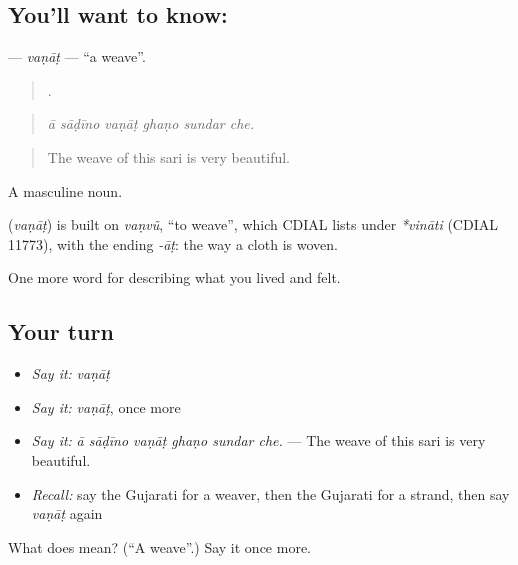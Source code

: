 \subsection*{You'll want to know: }
\textbf{} — \emph{vaṇāṭ} — \textquotedblleft{}a weave\textquotedblright{}.

\begin{quote}
     .
\end{quote}

\begin{quote}
\emph{ā sāḍīno vaṇāṭ ghaṇo sundar che.}
\end{quote}

\begin{quote}
The weave of this sari is very beautiful.
\end{quote}

A masculine noun.

\begin{cousinweb}
\textbf{} (\emph{vaṇāṭ}) is built on \emph{vaṇvũ}, \textquotedblleft{}to weave\textquotedblright{}, which CDIAL lists under \emph{*vināti} (CDIAL 11773), with the ending \emph{-āṭ}: the way a cloth is woven.
\end{cousinweb}

\begin{grammarlens}[title={What you've built}]
One more word for describing what you lived and felt.
\end{grammarlens}

\subsection*{Your turn}
\begin{itemize}
\raggedright
  \item \emph{Say it:} \emph{vaṇāṭ}
  \item \emph{Say it:} \emph{vaṇāṭ}, once more
  \item \emph{Say it:} \emph{ā sāḍīno vaṇāṭ ghaṇo sundar che.} — The weave of this sari is very beautiful.
  \item \emph{Recall:} say the Gujarati for a weaver, then the Gujarati for a strand, then say \emph{vaṇāṭ} again
\end{itemize}

\begin{tcolorbox}[breakable,colback=teal!4,colframe=teal!35!black,title={Before you move on}]
What does  mean? (\textquotedblleft{}A weave\textquotedblright{}.) Say it once more.
\end{tcolorbox}
